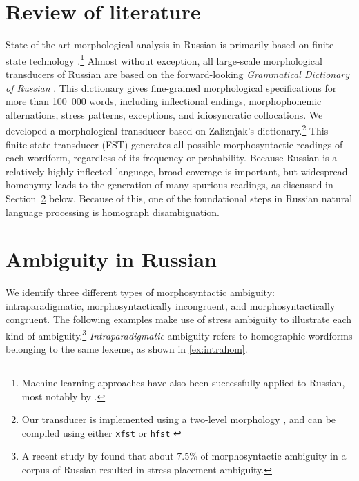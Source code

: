 \documentclass[11pt]{article}
\begin{document}
\section{Review of literature}
\label{sec:lit}
State-of-the-art morphological analysis in Russian is primarily based on
finite-state technology
\cite{Nozhov-03,Segalovich-03}.\footnote{Machine-learning approaches have also been successfully applied to Russian, most notably by 
.} Almost without exception, all large-scale 
morphological transducers of Russian are based on the
forward-looking \emph{Grammatical Dictionary of Russian} \cite{Zaliznjak-77}.
This dictionary gives fine-grained morphological specifications for more than
100~000 words, including inflectional endings, morphophonemic alternations, 
stress patterns, exceptions, and idiosyncratic collocations.
We developed a morphological transducer based on Zaliznjak's dictionary.\footnote{Our transducer is implemented using a two-level 
morphology \cite{Koskenniemi-84}, and can be compiled using either {\tt xfst}
\cite{Beesley.Karttunen-03} or {\tt hfst} \cite{hfst-11}} This finite-state transducer (FST) generates all possible 
morphosyntactic readings of each wordform, regardless of its frequency or probability. Because Russian is a relatively highly inflected language, broad coverage is important, but widespread homonymy leads to the generation of many spurious readings, as discussed in Section~\ref{ambiguity} below. Because of this, one of the foundational steps in Russian natural language processing is homograph disambiguation.






\section{Ambiguity in Russian} \label{ambiguity}

We identify three different types of morphosyntactic ambiguity: 
intraparadigmatic, morphosyntactically incongruent, and morphosyntactically 
congruent. The following examples make use of stress ambiguity to illustrate 
each kind of ambiguity.\footnote{A recent study by  
found that about 7.5\% of 
morphosyntactic ambiguity in a corpus of Russian resulted in stress placement 
ambiguity.} \emph{Intraparadigmatic} ambiguity refers to homographic 
wordforms belonging to the same lexeme, as shown in \ref{ex:intrahom}. 
\end{document}
